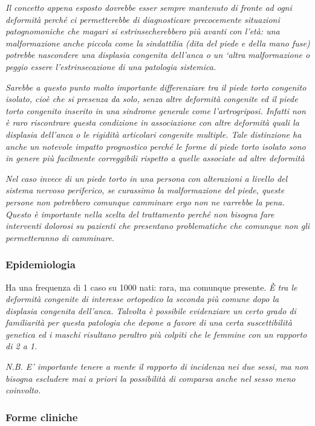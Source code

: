 \emph{Il concetto appena esposto dovrebbe esser sempre mantenuto di fronte ad ogni deformità perché ci permetterebbe di diagnosticare precocemente situazioni patognomoniche che magari si estrinsecherebbero più avanti con l'età: una malformazione anche piccola come la sindattilia (dita del piede e della mano fuse) potrebbe nascondere una displasia congenita dell'anca o un `altra malformazione o peggio essere l'estrinsecazione di una patologia sistemica.}

\emph{Sarebbe a questo punto molto importante differenziare tra il piede torto congenito \emph{isolato}, cioè che si presenza da solo, senza altre deformità congenite ed il piede torto congenito inserito in una
\emph{sindrome generale} come l'artrogriposi. Infatti non è raro riscontrare questa condizione in associazione con altre deformità quali la displasia dell'anca o le rigidità articolari congenite multiple. Tale distinzione ha anche un notevole impatto prognostico perché le forme di piede torto isolato sono in genere più facilmente correggibili rispetto a quelle associate ad altre deformità}

\emph{Nel caso invece di un piede torto in una persona con alterazioni a livello del sistema nervoso periferico, se curassimo la malformazione del piede, queste persone non potrebbero comunque camminare ergo non ne varrebbe la pena. Questo è importante nella scelta del trattamento
perché non bisogna fare interventi dolorosi su pazienti che presentano problematiche che comunque non gli permetteranno di camminare.}

\subsubsection{Epidemiologia }

Ha una frequenza di 1 caso su 1000 nati: rara, ma comunque presente. \emph{È tra le deformità congenite di interesse ortopedico la seconda più comune dopo la displasia congenita dell'anca. Talvolta è possibile evidenziare un certo grado di \emph{familiarità} per questa patologia che depone a favore di una certa suscettibilità genetica ed i maschi risultano peraltro più colpiti che le femmine con un rapporto di 2 a 1.}

\emph{N.B. E' importante tenere a mente il rapporto di incidenza nei due sessi, ma non bisogna escludere mai a priori la possibilità di comparsa
anche nel sesso meno coinvolto.}

\subsubsection{Forme cliniche}


